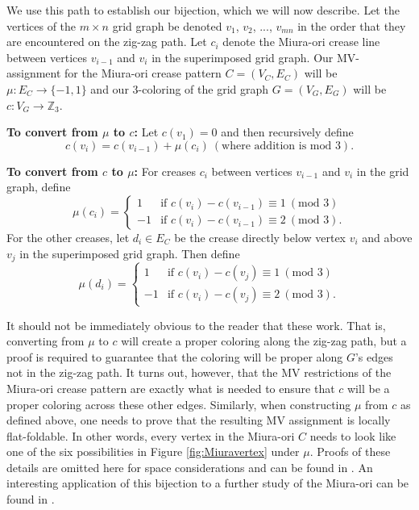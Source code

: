 \documentclass{amsart}
\theoremstyle{definition}
\begin{document}
We use this path to establish our bijection, which we will now describe.  Let the vertices of the $m\times n$ grid graph be denoted $v_1$, $v_2$, ..., $v_{mn}$ in the order that they are encountered on the zig-zag path.  Let $c_i$ denote the Miura-ori crease line between vertices $v_{i-1}$ and $v_i$ in the superimposed grid graph.  Our MV-assignment for the Miura-ori crease pattern $C=(V_C,E_C)$ will be $\mu:E_C\rightarrow \{-1,1\}$ and our 3-coloring of the grid graph $G=(V_G,E_G)$ will be $c:V_G\rightarrow \mathbb{Z}_3$.

{\bf To convert from $\mu$ to $c$:}  Let $c(v_1)=0$ and then recursively define
$$c(v_i) = c(v_{i-1}) +\mu(c_i)\ (\mbox{where addition is mod } 3).$$

{\bf To convert from $c$ to $\mu$:}  For creases $c_i$ between vertices $v_{i-1}$ and $v_i$ in the grid graph, define
$$\mu(c_i) = \left\{ \begin{array}{cl}
1 & \mbox{if }c(v_i)-c(v_{i-1})\equiv 1\ (\mbox{mod } 3) \\
-1 & \mbox{if }c(v_i)-c(v_{i-1})\equiv 2\ (\mbox{mod } 3).\end{array}\right.$$
For the other creases, let $d_i\in E_C$ be the crease directly below vertex $v_i$ and above $v_j$ in the superimposed grid graph.  Then define
$$\mu(d_i) = \left\{ \begin{array}{cl}
1 & \mbox{if }c(v_i)-c(v_j)\equiv 1\ (\mbox{mod } 3) \\
-1 & \mbox{if }c(v_i)-c(v_j)\equiv 2\ (\mbox{mod } 3).\end{array}\right.$$

It should not be immediately obvious to the reader that these work.  That is, converting from $\mu$ to $c$ will create a proper coloring along the zig-zag path, but a proof is required to guarantee that the coloring will be proper along $G$'s edges not in the zig-zag path.  It turns out, however, that the MV restrictions of the Miura-ori crease pattern are exactly what is needed to ensure that $c$ will be a proper coloring across these other edges.  Similarly, when constructing $\mu$ from $c$ as defined above, one needs to prove that the resulting MV assignment is locally flat-foldable.  In other words, every vertex in the Miura-ori $C$ needs to look like one of the six possibilities in Figure \ref{fig:Miuravertex} under $\mu$.  Proofs of these details are omitted here for space considerations and can be found in \cite{GHull}.  An interesting application of this bijection to a further study of the Miura-ori can be found in \cite{Hull5}.
\end{document}
